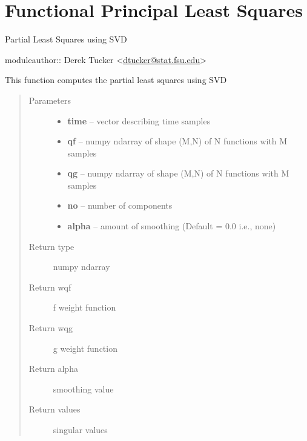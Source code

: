\documentclass[letterpaper,10pt,english]{sphinxmanual}
\begin{document}
\chapter{Functional Principal Least Squares}
\label{fPLS:functional-principal-least-squares}\label{fPLS::doc}\label{fPLS:module-fPLS}
Partial Least Squares using SVD

moduleauthor:: Derek Tucker \textless{}\href{mailto:dtucker@stat.fsu.edu}{dtucker@stat.fsu.edu}\textgreater{}

\begin{fulllineitems}
\label{fPLS:fPLS.pls_svd}
This function computes the partial least squares using SVD
\begin{quote}\begin{description}
\item[{Parameters}] \leavevmode\begin{itemize}
\item {} 
\textbf{time} -- vector describing time samples

\item {} 
\textbf{qf} -- numpy ndarray of shape (M,N) of N functions with M samples

\item {} 
\textbf{qg} -- numpy ndarray of shape (M,N) of N functions with M samples

\item {} 
\textbf{no} -- number of components

\item {} 
\textbf{alpha} -- amount of smoothing (Default = 0.0 i.e., none)

\end{itemize}

\item[{Return type}] \leavevmode
numpy ndarray

\item[{Return wqf}] \leavevmode
f weight function

\item[{Return wqg}] \leavevmode
g weight function

\item[{Return alpha}] \leavevmode
smoothing value

\item[{Return values}] \leavevmode
singular values

\end{description}\end{quote}

\end{fulllineitems}
\end{document}
